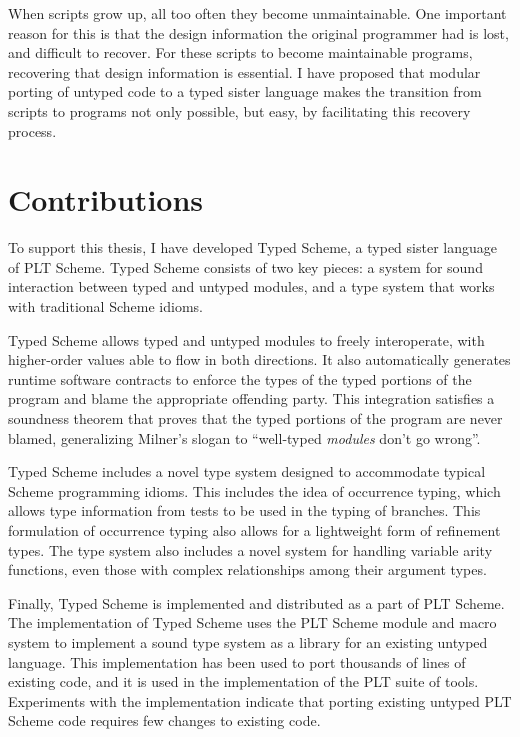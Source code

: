 

When scripts grow up, all too often they become unmaintainable.  One
important reason for this is that the design information the original
programmer had is lost, and difficult to recover.  For these scripts
to become maintainable programs, recovering that design information is
essential.  I have proposed that modular porting of untyped code to a
typed sister language makes the transition from scripts to programs
 not only possible, but easy, by facilitating this recovery process.

\section{Contributions}

To support this thesis, I have developed Typed Scheme, a typed sister
language of PLT Scheme.  Typed Scheme consists of two key pieces: a
system for sound interaction between typed and untyped modules, and a
type system that works with traditional Scheme idioms.  

Typed Scheme allows typed and untyped modules to freely interoperate,
with higher-order values able to flow in both directions.  It also
automatically generates runtime software contracts to enforce the
types of the typed portions of the program and blame the appropriate
offending party.  This integration satisfies 
a soundness theorem that proves that the
typed portions of the program are never blamed, generalizing Milner's
slogan to ``well-typed \emph{modules} don't go wrong''.

Typed Scheme includes a novel type system designed to accommodate
typical Scheme programming idioms.  This includes the idea of
occurrence typing, which allows type information from tests to be used
in the typing of branches.  This formulation of occurrence typing also
allows for a lightweight form of refinement types.  The type system
also includes a novel system for handling variable arity functions,
even those with complex relationships among their argument types.

Finally, Typed Scheme is implemented and distributed as a part of
PLT Scheme.  The implementation of Typed Scheme uses the PLT Scheme
module and macro system to implement a sound type system as a library
for an existing untyped language.  This implementation has been used
to port thousands of lines of existing code, and it is used in the
implementation of the PLT  suite of tools.  Experiments with the
implementation indicate that porting existing untyped PLT Scheme code
requires few changes to existing code.

